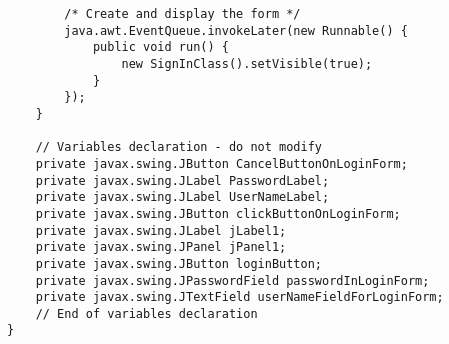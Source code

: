 \documentclass[12pt,a4paper]{article}
\begin{document}
\begin{lstlisting}
        /* Create and display the form */
        java.awt.EventQueue.invokeLater(new Runnable() {
            public void run() {
                new SignInClass().setVisible(true);
            }
        });
    }
    
    // Variables declaration - do not modify                     
    private javax.swing.JButton CancelButtonOnLoginForm;
    private javax.swing.JLabel PasswordLabel;
    private javax.swing.JLabel UserNameLabel;
    private javax.swing.JButton clickButtonOnLoginForm;
    private javax.swing.JLabel jLabel1;
    private javax.swing.JPanel jPanel1;
    private javax.swing.JButton loginButton;
    private javax.swing.JPasswordField passwordInLoginForm;
    private javax.swing.JTextField userNameFieldForLoginForm;
    // End of variables declaration                   
}

	\end{lstlisting}
	
\end{document}
